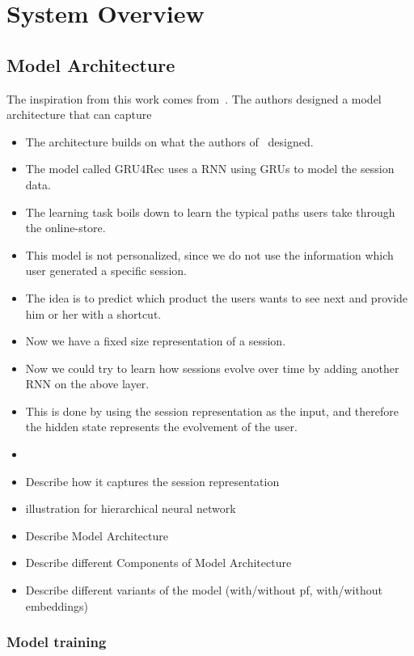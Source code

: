 \chapter{System Overview}

\section{Model Architecture}\label{sec:model_arch}

The inspiration from this work comes from~\cite{hierarchical}.
The authors designed a model architecture that can capture 
\begin{itemize}
    \item The architecture builds on what the authors of~\cite{gru4rec} designed.
    \item The model called GRU4Rec uses a RNN using GRUs to model the session data.
    \item The learning task boils down to learn the typical paths users take through the online-store.
    \item This model is not personalized, since we do not use the information which user generated a specific session.
    \item The idea is to predict which product the users wants to see next and provide him or her with a shortcut.
    \item Now we have a fixed size representation of a session.
    \item Now we could try to learn how sessions evolve over time by adding another RNN on the above layer.
    \item This is done by using the session representation as the input, and therefore the hidden state represents the evolvement of the user.
    \item 
    \item Describe how it captures the session representation
    \item illustration for hierarchical neural network
    \item Describe Model Architecture
    \item Describe different Components of Model Architecture
\item Describe different variants of the model (with/without pf, with/without embeddings)
\end{itemize}
\subsection{Model training}
